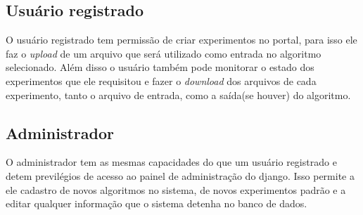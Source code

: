 \documentclass[tg]{mdtufsm}
\begin{document}
\subsection{Usuário registrado}
O usuário registrado tem permissão de criar experimentos no portal, para isso ele faz o \emph{upload} de um arquivo que será utilizado como entrada no algoritmo selecionado. Além disso o usuário também pode monitorar o estado dos experimentos que ele requisitou e fazer o \emph{download} dos arquivos de cada experimento, tanto o arquivo de entrada, como a saída(se houver) do algoritmo.
\subsection{Administrador}
O administrador tem as mesmas capacidades do que um usuário registrado e detem previlégios de acesso ao painel de administração do django. Isso permite a ele cadastro de novos algoritmos no sistema, de novos experimentos padrão e a editar qualquer informação que o sistema detenha no banco de dados.

\iffalse
\end{document}
